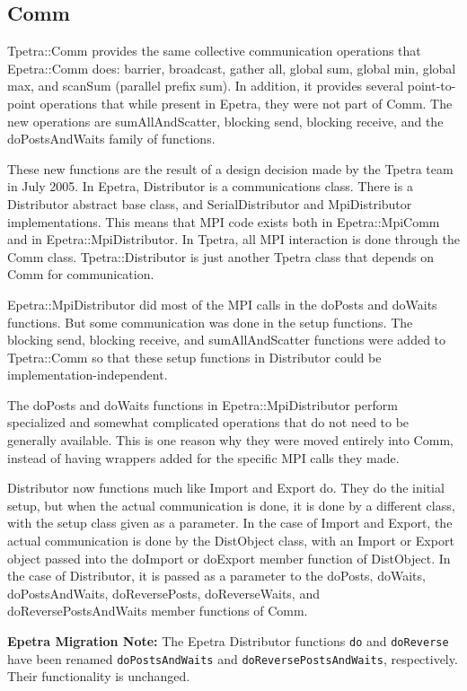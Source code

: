 \documentclass[10pt,relax]{TpetraDesign}
\begin{document}
%
\subsection{Comm}
Tpetra::Comm provides the same collective communication operations that Epetra::Comm does: barrier, broadcast, gather all, global sum, global min, global max, and scanSum (parallel prefix sum). In addition, it provides several point-to-point operations that while present in Epetra, they were not part of Comm. The new operations are sumAllAndScatter, blocking send, blocking receive, and the doPostsAndWaits family of functions.

These new functions are the result of a design decision made by the Tpetra team in July 2005. In Epetra, Distributor is a communications class. There is a Distributor abstract base class, and SerialDistributor and MpiDistributor implementations. This means that MPI code exists both in Epetra::MpiComm and in Epetra::MpiDistributor. In Tpetra, all MPI interaction is done through the Comm class. Tpetra::Distributor is just another Tpetra class that depends on Comm for communication.

Epetra::MpiDistributor did most of the MPI calls in the doPosts and doWaits functions. But some communication was done in the setup functions. The blocking send, blocking receive, and sumAllAndScatter functions were added to Tpetra::Comm so that these setup functions in Distributor could be implementation-independent. 

The doPosts and doWaits functions in Epetra::MpiDistributor perform specialized and somewhat complicated operations that do not need to be generally available. This is one reason why they were moved entirely into Comm, instead of having wrappers added for the specific MPI calls they made. 

Distributor now functions much like Import and Export do. They do the initial setup, but when the actual communication is done, it is done by a different class, with the setup class given as a parameter. In the case of Import and Export, the actual communication is done by the DistObject class, with an Import or Export object passed into the doImport or doExport member function of DistObject. In the case of Distributor, it is passed as a parameter to the doPosts, doWaits, doPostsAndWaits, doReversePosts, doReverseWaits, and doReversePostsAndWaits member functions of Comm.

\textbf{Epetra Migration Note:} The Epetra Distributor functions \texttt{do} and \texttt{doReverse} have been renamed \texttt{doPostsAndWaits} and \texttt{doReversePostsAndWaits}, respectively. Their functionality is unchanged.
\end{document}

